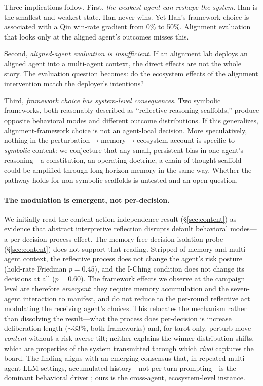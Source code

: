 \documentclass[11pt]{article}
\begin{document}
Three implications follow. First, \emph{the weakest agent can reshape the system}. Han is the smallest and weakest state. Han never wins. Yet Han's framework choice is associated with a Qin win-rate gradient from 0\% to 50\%. Alignment evaluation that looks only at the aligned agent's outcomes misses this.

Second, \emph{aligned-agent evaluation is insufficient}. If an alignment lab deploys an aligned agent into a multi-agent context, the direct effects are not the whole story. The evaluation question becomes: do the ecosystem effects of the alignment intervention match the deployer's intentions?

Third, \emph{framework choice has system-level consequences}. Two symbolic frameworks, both reasonably described as ``reflective reasoning scaffolds,'' produce opposite behavioral modes and different outcome distributions. If this generalizes, alignment-framework choice is not an agent-local decision. More speculatively, nothing in the perturbation$\to$memory$\to$ecosystem account is specific to \emph{symbolic} content: we conjecture that any small, persistent bias in one agent's reasoning---a constitution, an operating doctrine, a chain-of-thought scaffold---could be amplified through long-horizon memory in the same way. Whether the pathway holds for non-symbolic scaffolds is untested and an open question.

\paragraph{The modulation is emergent, not per-decision.}
We initially read the content-action independence result (\S\ref{sec:content}) as evidence that abstract interpretive reflection disrupts default behavioral modes---a per-decision process effect. The memory-free decision-isolation probe (\S\ref{sec:content}) does not support that reading. Stripped of memory and multi-agent context, the reflective process does not change the agent's risk posture (hold-rate Friedman $p = 0.45$), and the I-Ching condition does not change its decisions at all ($p = 0.60$). The framework effects we observe at the campaign level are therefore \emph{emergent}: they require memory accumulation and the seven-agent interaction to manifest, and do not reduce to the per-round reflective act modulating the receiving agent's choices. This relocates the mechanism rather than dissolving the result---what the process does per-decision is increase deliberation length (${\sim}33\%$, both frameworks) and, for tarot only, perturb move \emph{content} without a risk-averse tilt; neither explains the winner-distribution shifts, which are properties of the system transmitted through which \emph{rival} captures the board. The finding aligns with an emerging consensus that, in repeated multi-agent LLM settings, accumulated history---not per-turn prompting---is the dominant behavioral driver \citep{MemoryCurse2026, NetworkHistory2025}; ours is the cross-agent, ecosystem-level instance.
\end{document}
